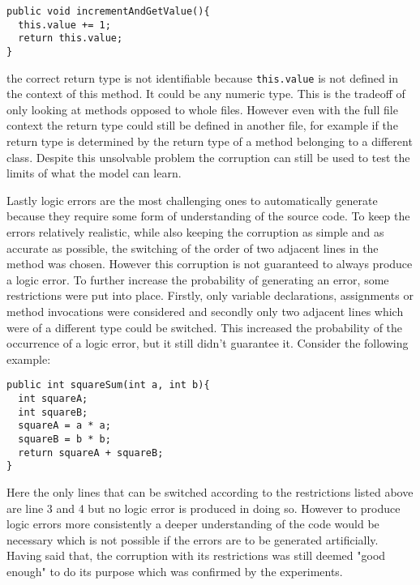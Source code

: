 \begin{lstlisting}[style=inline]
public void incrementAndGetValue(){
  this.value += 1;
  return this.value;
}
\end{lstlisting}

\noindent the correct return type is not identifiable because \texttt{this.value} is not defined in the context of this method. It could be any numeric type. This is the tradeoff of only looking at methods opposed to whole files. However even with the full file context the return type could still be defined in another file, for example if the return type is determined by the return type of a method belonging to a different class. Despite this unsolvable problem the corruption can still be used to test the limits of what the model can learn.

Lastly logic errors are the most challenging ones to automatically generate because they require some form of understanding of the source code. To keep the errors relatively realistic, while also keeping the corruption as simple and as accurate as possible, the switching of the order of two adjacent lines in the method was chosen. However this corruption is not guaranteed to always produce a logic error. To further increase the probability of generating an error, some restrictions were put into place. Firstly, only variable declarations, assignments or method invocations were considered and secondly only two adjacent lines which were of a different type could be switched. This increased the probability of the occurrence of a logic error, but it still didn't guarantee it. Consider the following example:

\begin{lstlisting}[style=inline]
public int squareSum(int a, int b){
  int squareA;
  int squareB;
  squareA = a * a;
  squareB = b * b;
  return squareA + squareB;
}
\end{lstlisting}

Here the only lines that can be switched according to the restrictions listed above are line 3 and 4 but no logic error is produced in doing so. However to produce logic errors more consistently a deeper understanding of the code would be necessary which is not possible if the errors are to be generated artificially. Having said that, the corruption with its restrictions was still deemed "good enough" to do its purpose which was confirmed by the experiments.

